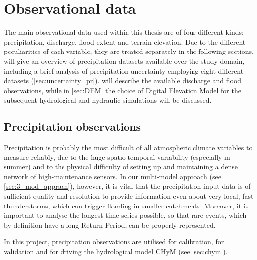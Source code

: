 \chapter{Observational data}\label{chp:obs}
The main observational data used within this thesis are of four different kinds: precipitation, discharge, flood extent and terrain elevation. Due to the different peculiarities of each variable, they are treated separately in the following sections.  will give an overview of precipitation datasets available over the study domain, including a brief analysis of precipitation uncertainty employing eight different datasets (\cref{sec:uncertainty_pr}).  will describe the available discharge and flood observations, while in \cref{sec:DEM} the choice of Digital Elevation Model for the subsequent hydrological and hydraulic simulations will be discussed.

\section{Precipitation observations} \label{sec:pr_obs}
Precipitation is probably the most difficult of all atmospheric climate variables to measure reliably, due to the huge spatio-temporal variability (especially in summer) and to the physical difficulty of setting up and maintaining a dense network of high-maintenance sensors. In our multi-model approach (see \cref{sec:3_mod_apprach}), however, it is vital that the precipitation input data is of sufficient quality and resolution to provide information even about very local, fast thunderstorms, which can trigger flooding in smaller catchments. Moreover, it is important to analyse the longest time series possible, so that rare events, which by definition have a long Return Period, can be properly represented.

In this project, precipitation observations are utilised for calibration, for validation and for driving the hydrological model CHyM (see \cref{sec:chym}).
  
